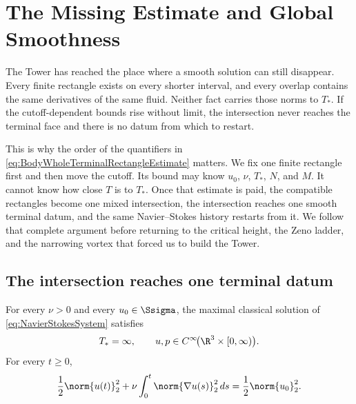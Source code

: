 \clearpage
\section{The Missing Estimate and Global Smoothness}\label{sec:TheMissingEstimateAndGlobalSmoothness}

The Tower has reached the place where a smooth solution can still disappear.
Every finite rectangle exists on every shorter interval, and every overlap
contains the same derivatives of the same fluid.  Neither fact carries those
norms to \(T_*\).  If the cutoff-dependent bounds rise without limit, the
intersection never reaches the terminal face and there is no datum from which
to restart.

This is why the order of the quantifiers in
\eqref{eq:BodyWholeTerminalRectangleEstimate} matters.  We fix one finite
rectangle first and then move the cutoff.  Its bound may know \(u_0\), \(\nu\),
\(T_*\), \(N\), and \(M\).  It cannot know how close \(T\) is to \(T_*\).
Once that estimate is paid, the compatible rectangles become one mixed
intersection, the intersection reaches one smooth terminal datum, and the same
Navier--Stokes history restarts from it.  We follow that complete argument
before returning to the critical height, the Zeno ladder, and the narrowing
vortex that forced us to build the Tower.

\subsection{The intersection reaches one terminal datum}\label{sub:NoFiniteSingularTime}

\begin{theorem}\label{thm:MainGlobalRegularity}
For every \(\nu>0\) and every \(u_0\in\Ssigma\), the maximal classical solution of \eqref{eq:NavierStokesSystem} satisfies
\begin{equation}\label{eq:BodyGlobalSmoothnessConclusion}
  T_*=\infty,
  \qquad
  u,p\in C^\infty\!\bigl(\R^3\times[0,\infty)\bigr).
\end{equation}
For every \(t\geq0\),
\begin{equation}\label{eq:GlobalEnergyConclusion}
  \frac12\norm{u(t)}_2^2
  +\nu\int_0^t\norm{\nabla u(s)}_2^2\,ds
  =\frac12\norm{u_0}_2^2.
\end{equation}
\end{theorem}

